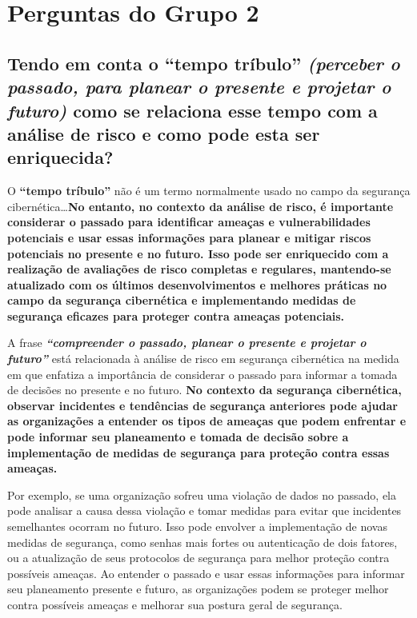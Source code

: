 \chapter{Perguntas do Grupo 2}

\section[Pergunta]{Tendo em conta o \textbf{``tempo tríbulo''} \textit{(perceber o passado, para planear o presente e projetar o futuro)} como se relaciona esse tempo com a análise de risco e como pode esta ser enriquecida?}

O \textbf{``tempo tríbulo''} não é um termo normalmente usado no campo da segurança cibernética\ldots \textbf{No entanto, no contexto da análise de risco, é importante considerar o passado para identificar ameaças e vulnerabilidades potenciais e usar essas informações para planear e mitigar riscos potenciais no presente e no futuro. Isso pode ser enriquecido com a realização de avaliações de risco completas e regulares, mantendo-se atualizado com os últimos desenvolvimentos e melhores práticas no campo da segurança cibernética e implementando medidas de segurança eficazes para proteger contra ameaças potenciais.}

A frase \textbf{\textit{``compreender o passado, planear o presente e projetar o futuro''}} está relacionada à análise de risco em segurança cibernética na medida em que enfatiza a importância de considerar o passado para informar a tomada de decisões no presente e no futuro. \textbf{No contexto da segurança cibernética, observar incidentes e tendências de segurança anteriores pode ajudar as organizações a entender os tipos de ameaças que podem enfrentar e pode informar seu planeamento e tomada de decisão sobre a implementação de medidas de segurança para proteção contra essas ameaças.}

Por exemplo, se uma organização sofreu uma violação de dados no passado, ela pode analisar a causa dessa violação e tomar medidas para evitar que incidentes semelhantes ocorram no futuro. Isso pode envolver a implementação de novas medidas de segurança, como senhas mais fortes ou autenticação de dois fatores, ou a atualização de seus protocolos de segurança para melhor proteção contra possíveis ameaças. Ao entender o passado e usar essas informações para informar seu planeamento presente e futuro, as organizações podem se proteger melhor contra possíveis ameaças e melhorar sua postura geral de segurança.


